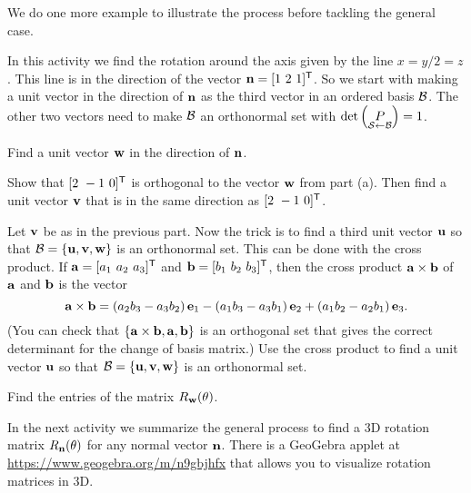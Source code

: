 We do one more example to illustrate the process before tackling the general case. 

\begin{pactivity} \label{act:rot_ex} In this activity we find the rotation around the axis given by the line $x=y/2=z$. This line is in the direction of the vector $\mathbf{n} = [1 \ 2 \ 1]^{\mathsf{T}}$. So we start with making a unit vector in the direction of $\mathbf{n}$ as the third vector in an ordered basis $\mathcal{B}$. The other two vectors need to make $\mathcal{B}$ an orthonormal set with $\det\left(\underset{\mathcal{S} \leftarrow \mathcal{B}}{P} \right) = 1$.
\ba
\item  Find a unit vector $\mathbf{w}$ in the direction of $\mathbf{n}$. 
	
	
\item Show that $[2 \ -1 \ 0]^{\tr}$ is orthogonal to the vector $\mathbf{w}$ from part (a). Then find a unit vector $\mathbf{v}$ that is in the same direction as $[2 \ -1 \ 0]^{\tr}$. 


\item Let $\mathbf{v}$ be as in the previous part. Now the trick is to find a third unit vector $\mathbf{u}$ so that $\mathcal{B} = \{\mathbf{u}, \mathbf{v}, \mathbf{w}\}$ is an orthonormal set. This can be done with the cross product. If $\va = [a_1 \ a_2 \ a_3]^{\tr}$ and $\vb = [b_1 \ b_2 \ b_3]^{\tr}$, then the cross product $\mathbf{a} \times \mathbf{b}$ of $\mathbf{a}$ and $\mathbf{b}$ is the vector 
\[\mathbf{a} \times \mathbf{b} = \left(a_2b_3-a_3b_2\right) \mathbf{e}_1 - \left(a_1b_3-a_3b_1\right) \mathbf{e}_2 + \left(a_1b_2-a_2b_1\right) \mathbf{e}_3.\]
(You can check that $\{\mathbf{a} \times \mathbf{b}, \mathbf{a}, \mathbf{b}\}$ is an orthogonal set that gives the correct determinant for the change of basis matrix.) Use the cross product to find a unit vector $\mathbf{u}$ so that $\mathcal{B} = \{\mathbf{u}, \mathbf{v}, \mathbf{w}\}$ is an orthonormal set. 
 

\item Find the entries of the matrix $R_{\mathbf{w}}(\theta)$. 

\ea

\end{pactivity}

In the next activity we summarize the general process to find a 3D rotation matrix $R_{\mathbf{n}}(\theta)$ for any normal vector $\mathbf{n}$. There is a GeoGebra applet at \url{https://www.geogebra.org/m/n9gbjhfx} that allows you to visualize rotation matrices in 3D. 

